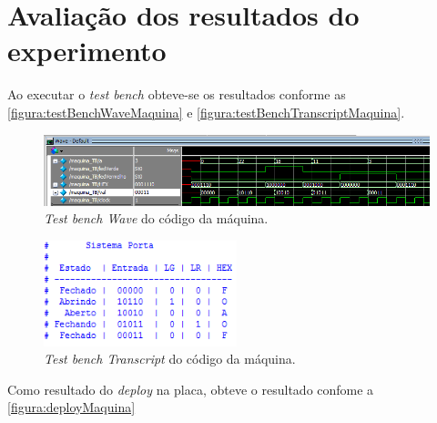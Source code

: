 \chapter{Avaliação dos resultados do experimento}
	Ao executar o \textit{test bench} obteve-se os resultados conforme as
	\autoref{figura:testBenchWaveMaquina} e \autoref{figura:testBenchTranscriptMaquina}.

	\begin{figure}[H]
		 \centering
		 \caption{\label{figura:testBenchWaveMaquina}\textit{Test bench Wave} do código da máquina.}
		 \includegraphics[width=1\textwidth]{img/maquina/testBenchWave}
	\end{figure}

	\begin{figure}[H]
		 \centering
		 \caption{\label{figura:testBenchTranscriptMaquina}\textit{Test bench Transcript} do código da máquina.}
		 \includegraphics[width=0.5\textwidth]{img/maquina/testBenchTranscript}
	\end{figure}

	Como resultado do \textit{deploy} na placa, obteve o resultado confome a
	\autoref{figura:deployMaquina}

